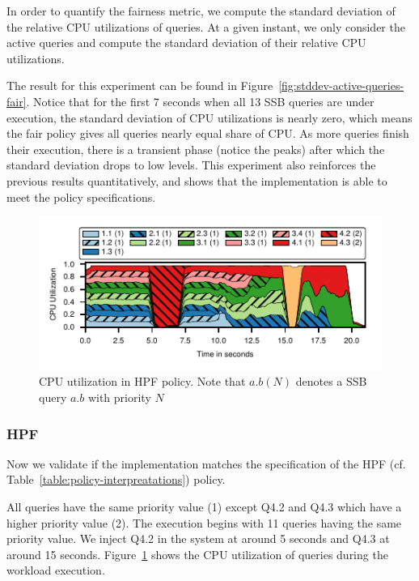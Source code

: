 In order to quantify the fairness metric, we compute the standard deviation of the relative CPU utilizations of queries.
At a given instant, we only consider the active queries and compute the standard deviation of their relative CPU utilizations. 

The result for this experiment can be found in Figure~\ref{fig:stddev-active-queries-fair}.
Notice that for the first 7 seconds when all 13 SSB queries are under execution, the standard deviation of CPU utilizations is nearly zero, which means the fair policy gives all queries nearly equal share of CPU. 
As more queries finish their execution, there is a transient phase (notice the peaks) after which the standard deviation drops to low levels. 
This experiment also reinforces the previous results quantitatively, and shows that the implementation is able to meet the policy specifications.

\begin{figure}
	\centering
	\includegraphics[width=\textwidth]{policy/figures/ssb-hpf-all.pdf}
	\caption{CPU utilization in HPF policy. Note that $a.b  (N)$ denotes a SSB query $a.b$ with priority $N$}
	\label{fig:hpf-all}
\end{figure}

\subsubsection{HPF}
Now we validate if the implementation matches the 
specification of the HPF (cf. Table~\ref{table:policy-interpreatations}) policy.

All queries have the same priority value (1) except Q4.2 and Q4.3 which have a higher priority value (2). 
The execution begins with 11 queries having the same priority value. %
We inject Q4.2 in the system at around 5 seconds and Q4.3 at around 15 seconds.
Figure~\ref{fig:hpf-all} shows the CPU utilization of queries during the workload 
execution.


